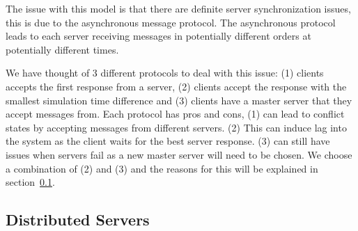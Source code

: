 	The issue with this model is that there are definite server synchronization issues, this is due to the asynchronous message protocol. The asynchronous protocol leads to each server receiving messages in potentially different orders at potentially different times.
	
	We have thought of 3 different protocols to deal with this issue: (1) clients accepts the first response from a server, (2) clients accept the response with the smallest simulation time difference and (3) clients have a master server that they accept messages from. Each protocol has pros and cons, (1) can lead to conflict states by accepting messages from different servers. (2) This can induce lag into the system as the client waits for the best server response. (3) can still have issues when servers fail as a new master server will need to be chosen. We choose a combination of (2) and (3) and the reasons for this will be explained in section~\ref{subsec:distributed-servers}.
	
\subsection{Distributed Servers}
\label{subsec:distributed-servers}


		

	
